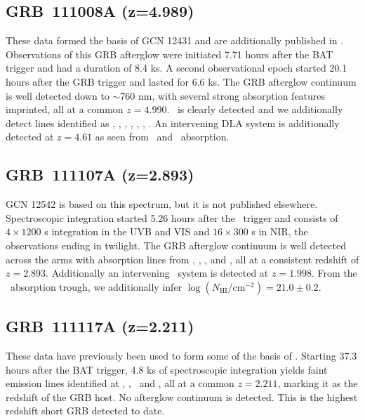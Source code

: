 \documentclass[longauth]{aa}    %
\begin{document}
\subsection{GRB~111008A  (z=4.989)} \label{111008}

These data formed the basis of GCN 12431 \citep{GCN12431} and are additionally
published in \citet{Sparre2014}. Observations of this GRB afterglow were
initiated 7.71 hours after the BAT trigger and had a duration of 8.4 ks. A second
observational epoch started 20.1 hours after the GRB trigger and lasted for
6.6 ks. The GRB afterglow continuum is well detected down to $\sim$760 nm, with
several strong absorption features imprinted, all at a common $z = 4.990$.
\lya~is clearly detected and we additionally detect lines identified as \SIii,
\feii, \civ, \mgii, \SIii*, \sii*, \oi*. An intervening DLA system is
additionally detected at  $z = 4.61$ as seen from \lya~and \mgii~absorption.

\subsection{GRB~111107A (z=2.893)} \label{111107}

GCN 12542 \citep{GCN12542} is based on this spectrum, but it is not published
elsewhere. Spectroscopic integration started 5.26 hours after the \swift~trigger
and consists of $4 \times 1200$ s integration in the UVB and VIS and $16 \times
300$ s in NIR, the observations ending in twilight. The GRB afterglow continuum
is well detected across the arms with absorption lines from \lya, \civ, \feii,
and \mgii, all at a consistent redshift of $z = 2.893$. Additionally an
intervening \mgii~system is detected at $z = 1.998$. From the \lya~absorption
trough, we additionally infer $\log (N_{\mathrm{HI}}/\mathrm{cm}^{-2}) = 21.0
\pm 0.2$.

\subsection{GRB~111117A (z=2.211)} \label{111117}

These data have previously been used to form some of the basis of
\citet{Selsing2017}. Starting 37.3 hours after the BAT trigger, 4.8 ks of
spectroscopic integration yields faint emission lines identified at \oii, \hb,
\oiii~and \ha, all at a common $z = 2.211$, marking it as the redshift of the
GRB host. No afterglow continuum is detected. This is the highest redshift short
GRB detected to date.
\end{document}
